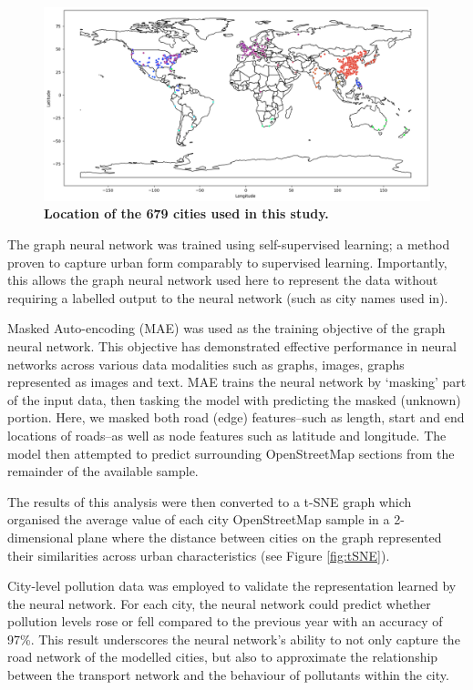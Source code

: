 \documentclass[preprint,12pt]{elsarticle}
\begin{document}
\begin{figure}
\centering
\includegraphics[trim={0 0 0 0},clip,scale=0.4]{Images/ByCountry_map_Zeigler.png}
\caption{\bf Location of the 679 cities used in this study.}
 \label{fig:clusters}
\end{figure}


The graph neural network was trained using self-supervised learning; a method proven to capture urban form comparably to supervised learning\cite{seneviratne2021self}. Importantly, this allows the graph neural network used here to represent the data without requiring a labelled output to the neural network (such as city names used in\cite{Thompson2020}).

Masked Auto-encoding (MAE) was used as the training objective of the graph neural network. This objective has demonstrated effective performance in neural networks across various data modalities such as graphs\cite{hou2022graphmae}, images\cite{he2022masked}, graphs represented as images\cite{seneviratne2022self} and text\cite{devlin2018bert}. MAE trains the neural network by `masking' part of the input data, then tasking the model with predicting the masked (unknown) portion. Here, we masked both road (edge) features--such as length, start and end locations of roads--as well as node features such as latitude and longitude. The model then attempted to predict surrounding OpenStreetMap sections from the remainder of the available sample. 

The results of this analysis were then converted to a t-SNE\cite{scikit-learn} graph which organised the average value of each city OpenStreetMap sample in a 2-dimensional plane where the distance between cities on the graph represented their similarities across urban characteristics (see Figure \ref{fig:tSNE}).

City-level pollution data was employed to validate the representation learned by the neural network. For each city, the neural network could predict whether pollution levels rose or fell compared to the previous year with an accuracy of 97\%. This result underscores the neural network's ability to not only capture the road network of the modelled cities, but also to approximate the relationship between the transport network and the behaviour of pollutants within the city.
\end{document}
